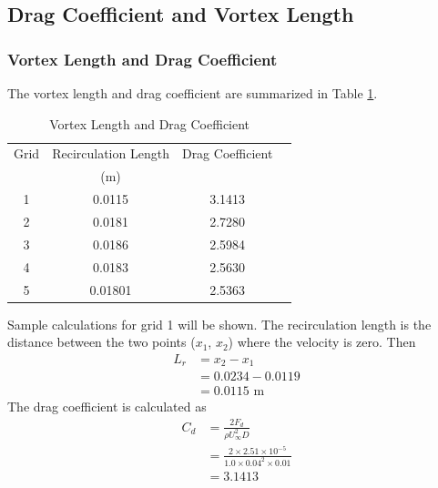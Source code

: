 \subsection{Drag Coefficient and Vortex Length}
\subsubsection{Vortex Length and Drag Coefficient}
The vortex length and drag coefficient are summarized in Table \ref{tab:vortex_length_drag_coefficient_summary}. 
\begin{table}[H]
    \centering
    \caption{Vortex Length and Drag Coefficient}
    \label{tab:vortex_length_drag_coefficient_summary}
    \begin{tabular}{cccc}
        \toprule
        Grid & Recirculation Length & Drag Coefficient \\
        & (m) & \\
        \midrule
        1 & 0.0115 & 3.1413 \\
        2 & 0.0181 & 2.7280 \\
        3 & 0.0186 & 2.5984 \\
        4 & 0.0183 & 2.5630 \\
        5 & 0.01801 & 2.5363 \\
        \bottomrule
    \end{tabular}
\end{table}
Sample calculations for grid 1 will be shown. The recirculation length is the distance between the two points ($x_1$, $x_2$) where the velocity is zero. Then
\begin{align*}
    L_r &= x_2 - x_1 \\
    &= 0.0234 - 0.0119 \\
    &= 0.0115 \text{ m}
\end{align*}
The drag coefficient is calculated as
\begin{align*}
    C_d &= \frac{2F_d}{\rho U_\infty^2 D} \\
    &= \frac{2 \times 2.51 \times 10^{-5}}{1.0 \times 0.04^2 \times 0.01} \\
    &= 3.1413
\end{align*}


